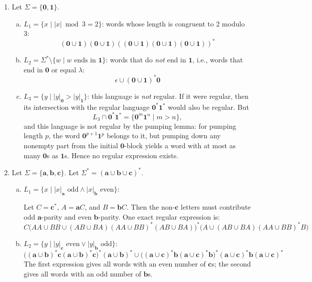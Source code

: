 \begin{enumerate}[{6.}1.]
\item Let $\Sigma=\{\pmb{0},\pmb{1}\}$.

\begin{enumerate}[(a)]
  \item $L_1=\{x\mid|x|\bmod 3=2\}$: words whose length is congruent to 2 modulo 3:
  \[
    (\pmb{0}\cup\pmb{1})(\pmb{0}\cup\pmb{1})((\pmb{0}\cup\pmb{1})(\pmb{0}\cup\pmb{1})(\pmb{0}\cup\pmb{1}))^*
  \]

  \item $L_2=\Sigma^*\setminus\{w\mid w\text{ ends in }\pmb{1}\}$: words that do \emph{not} end in $\pmb{1}$, i.e., words that end in $\pmb{0}$ or equal $\lambda$:
  \[
    \epsilon\cup(\pmb{0}\cup\pmb{1})^*\pmb{0}
  \]

  \item $L_3=\{y\mid|y|_{\pmb{0}}>|y|_{\pmb{1}}\}$: this language is \emph{not}
  regular.  If it were regular, then its intersection with the regular language
  $\pmb{0}^*\pmb{1}^*$ would also be regular.  But
  \[
    L_3\cap\pmb{0}^*\pmb{1}^*=\{\pmb{0}^m\pmb{1}^n\mid m>n\},
  \]
  and this language is not regular by the pumping lemma: for pumping length
  $p$, the word $\pmb{0}^{p+1}\pmb{1}^p$ belongs to it, but pumping down any
  nonempty part from the initial $\pmb{0}$-block yields a word with at most as
  many $\pmb{0}$s as $\pmb{1}$s.  Hence no regular expression exists.
\end{enumerate}

\item Let $\Sigma=\{\pmb{a},\pmb{b},\pmb{c}\}$.  Let $\Sigma^*=(\pmb{a}\cup\pmb{b}\cup\pmb{c})^*$.

\begin{enumerate}[(a)]
  \item $L_1=\{x\mid|x|_{\pmb{a}}\text{ odd}\wedge|x|_{\pmb{b}}\text{ even}\}$:

  Let $C=\pmb{c}^*$, $A=\pmb{a}C$, and $B=\pmb{b}C$.  Then the non-$\pmb{c}$
  letters must contribute odd $\pmb{a}$-parity and even $\pmb{b}$-parity.  One
  exact regular expression is:
  \[
    C\bigl(AA\cup BB\cup(AB\cup BA)(AA\cup BB)^*(AB\cup BA)\bigr)^*
    \bigl(A\cup(AB\cup BA)(AA\cup BB)^*B\bigr)
  \]

  \item $L_2=\{y\mid|y|_{\pmb{c}}\text{ even}\vee|y|_{\pmb{b}}\text{ odd}\}$:
  \[
    \bigl((\pmb{a}\cup\pmb{b})^*\pmb{c}(\pmb{a}\cup\pmb{b})^*\pmb{c}\bigr)^*(\pmb{a}\cup\pmb{b})^*
    \cup
    \bigl((\pmb{a}\cup\pmb{c})^*\pmb{b}(\pmb{a}\cup\pmb{c})^*\pmb{b}\bigr)^*(\pmb{a}\cup\pmb{c})^*\pmb{b}(\pmb{a}\cup\pmb{c})^*
  \]
  The first expression gives all words with an even number of $\pmb{c}$s; the
  second gives all words with an odd number of $\pmb{b}$s.


\end{enumerate}
\end{enumerate}
